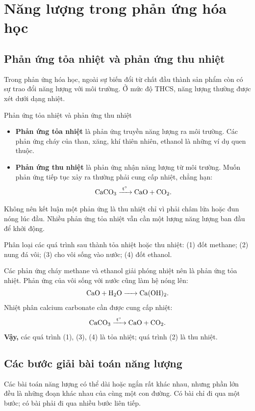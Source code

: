 \section{Năng lượng trong phản ứng hóa học}

\subsection{Phản ứng tỏa nhiệt và phản ứng thu nhiệt}

Trong phản ứng hóa học, ngoài sự biến đổi từ chất đầu thành sản phẩm còn có sự trao đổi năng lượng với môi trường. Ở mức độ THCS, năng lượng thường được xét dưới dạng nhiệt.

\begin{ghinho}{Phản ứng tỏa nhiệt và phản ứng thu nhiệt}
\begin{itemize}
\item \textbf{Phản ứng tỏa nhiệt} là phản ứng truyền năng lượng ra môi trường. Các phản ứng cháy của than, xăng, khí thiên nhiên, ethanol là những ví dụ quen thuộc.
\item \textbf{Phản ứng thu nhiệt} là phản ứng nhận năng lượng từ môi trường. Muốn phản ứng tiếp tục xảy ra thường phải cung cấp nhiệt, chẳng hạn:
\[
\ce{CaCO3 ->[t^\circ] CaO + CO2}.
\]
\end{itemize}
Không nên kết luận một phản ứng là thu nhiệt chỉ vì phải châm lửa hoặc đun nóng lúc đầu. Nhiều phản ứng tỏa nhiệt vẫn cần một lượng năng lượng ban đầu để khởi động.
\end{ghinho}

\begin{vidu}
Phân loại các quá trình sau thành tỏa nhiệt hoặc thu nhiệt: (1) đốt methane; (2) nung đá vôi; (3) cho vôi sống vào nước; (4) đốt ethanol.
\end{vidu}
\begin{loigiai}
Các phản ứng cháy methane và ethanol giải phóng nhiệt nên là phản ứng tỏa nhiệt. Phản ứng của vôi sống với nước cũng làm hệ nóng lên:
\[
\ce{CaO + H2O -> Ca(OH)2}.
\]
Nhiệt phân calcium carbonate cần được cung cấp nhiệt:
\[
\ce{CaCO3 ->[t^\circ] CaO + CO2}.
\]
\textbf{Vậy,} các quá trình (1), (3), (4) là tỏa nhiệt; quá trình (2) là thu nhiệt.
\end{loigiai}

\subsection{Các bước giải bài toán năng lượng}

Các bài toán năng lượng có thể dài hoặc ngắn rất khác nhau, nhưng phần lớn đều là những đoạn khác nhau của cùng một con đường. Có bài chỉ đi qua một bước; có bài phải đi qua nhiều bước liên tiếp.

